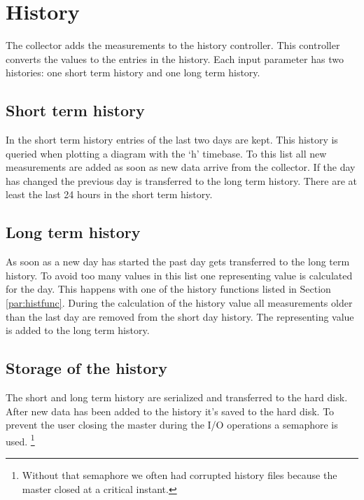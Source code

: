 {\C  }


\section{History} %
\label{sec:history}
The collector adds the measurements to the history controller. This controller converts the values to the entries in the history. Each input parameter has two histories: one short term history and one long term history. 
\subsection{Short term history} %
\label{sub:short_term_history}
In the short term history entries of the last two days are kept. This history is queried when plotting a diagram with the `h' timebase. To this list all new measurements are added as soon as new data arrive from the collector. If the day has changed the previous day is transferred to the long term history. There are at least the last 24 hours in the short term history.

\subsection{Long term history} %
\label{ssub:long_term_history}
As soon as a new day has started the past day gets transferred to the long term history. To avoid too many values in this list one representing value is calculated for the day. This happens with one of the history functions listed in Section \ref{par:histfunc}. During the calculation of the history value all measurements older than the last day are removed from the short day history. The representing value is added to the long term history.

\subsection{Storage of the history} %
\label{sub:storage_of_the_history}
The short and long term history are serialized and transferred to the hard disk. After new data has been added to the history it's saved to the hard disk. To prevent the user closing the master during the I/O operations a semaphore is used. \footnote{Without that semaphore we often had corrupted history files because the master closed at a critical instant.}

